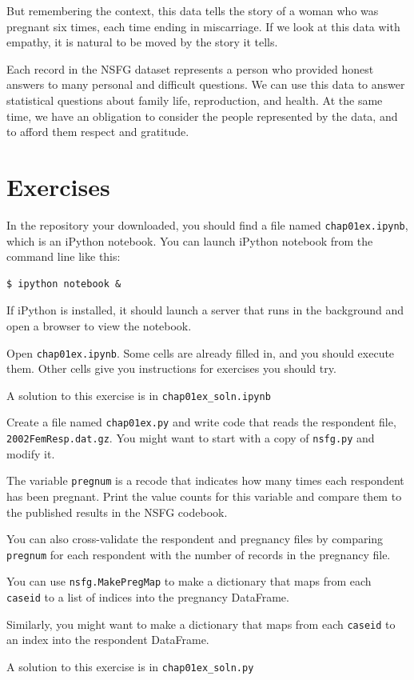 \documentclass[12pt]{book}
\begin{document}
But remembering the context, this data tells the story of a woman
who was pregnant six times, each time ending in miscarriage.  If we
look at this data with empathy, it is natural to be moved by the
story it tells.

Each record in the NSFG dataset represents a person who provided
honest answers to many personal and difficult questions.  We can use
this data to answer statistical questions about family life,
reproduction, and health.  At the same time, we have an obligation
to consider the people represented by the data, and to afford them
respect and gratitude.


\section{Exercises}

\begin{exercise}
In the repository your downloaded, you should find a file named
\verb"chap01ex.ipynb", which is an iPython notebook.  You can
launch iPython notebook from the command line like this:

\begin{verbatim}
$ ipython notebook &
\end{verbatim}

If iPython is installed, it should launch a server that runs in the
background and open a browser to view the notebook.

Open \verb"chap01ex.ipynb".  Some cells are already filled in, and
you should execute them.  Other cells give you instructions for
exercises you should try.

A solution to this exercise is in \verb"chap01ex_soln.ipynb"
\end{exercise}


\begin{exercise}
Create a file named \verb"chap01ex.py" and write code that reads
the respondent file, {\tt 2002FemResp.dat.gz}.  You might want to
start with a copy of {\tt nsfg.py} and modify it.

The variable {\tt pregnum} is a recode that indicates how many
times each respondent has been pregnant.  Print the value counts
for this variable and compare them to the published results in
the NSFG codebook.

You can also cross-validate the respondent and pregnancy files by
comparing {\tt pregnum} for each respondent with the number of
records in the pregnancy file.

You can use {\tt nsfg.MakePregMap} to make a dictionary that maps
from each {\tt caseid} to a list of indices into the pregnancy
DataFrame.

Similarly, you might want to make a dictionary that maps from each
{\tt caseid} to an index into the respondent DataFrame.

A solution to this exercise is in \verb"chap01ex_soln.py"
\end{exercise}
\end{document}
